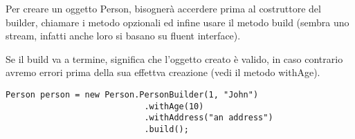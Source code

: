 Per creare un oggetto Person, bisognerà accerdere prima al costruttore del builder, chiamare i metodo opzionali ed infine usare il metodo build 
(sembra uno stream, infatti anche loro si basano su fluent interface).

Se il build va a termine, significa che l'oggetto creato è valido, in caso contrario avremo errori prima della sua effettva creazione (vedi il metodo withAge).

\begin{lstlisting}
Person person = new Person.PersonBuilder(1, "John")
                            .withAge(10)
                            .withAddress("an address")
                            .build();
\end{lstlisting}